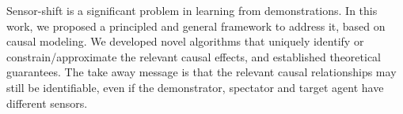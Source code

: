 \documentclass[letterpaper]{article} %
\theoremstyle{definition}%
\theoremstyle{definition}
\begin{document}
Sensor-shift is a significant problem in learning from demonstrations. In this work, we proposed a principled and general framework to address it, based on causal modeling.
We developed novel algorithms that uniquely identify or constrain/approximate the relevant causal effects, and established theoretical guarantees.
The take away message is that the relevant causal relationships may still be identifiable, even if the demonstrator, spectator and target agent have different sensors.



\end{document}
